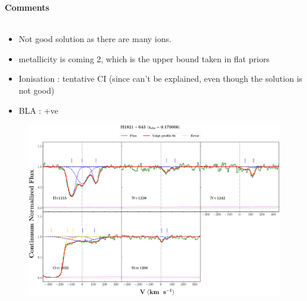 \documentclass[12pt,draft]{report}
\newcommand\ion[2]{\text{#1\,\textsc{\lowercase{#2}}}}
\begin{document}
\newpage

\textbf{Comments}
\\\\
\begin{itemize}
    \item Not good solution as there are many ions.
    \item metallicity is coming 2, which is the upper bound taken in flat priors
    \item Ionisation : tentative CI (since \ion{O}{vi} can't be explained, even though the solution is not good)
    \item BLA : +ve
\end{itemize}



\newpage

\begin{landscape}

\begin{figure}
    \centering
    \vspace{-20mm}
    \hspace*{-35mm}
    \includegraphics[width=1.25\linewidth]{System-Plots/H1821+643_z=0.170006_sys_plot.png}
\end{figure}

\end{landscape}
\end{document}
